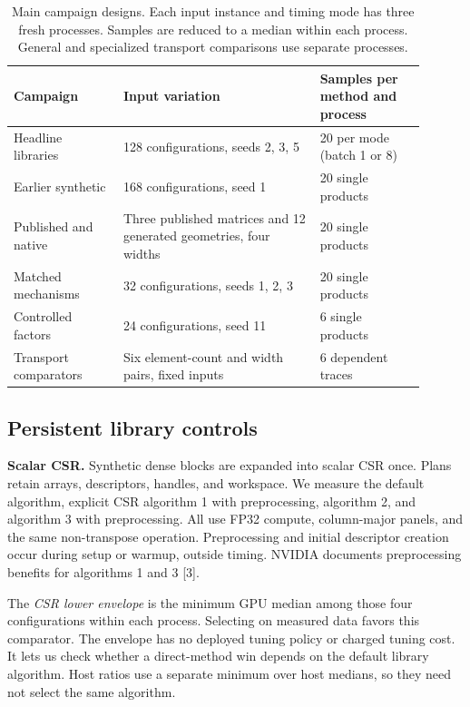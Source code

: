 \documentclass[10pt]{article}
\begin{document}
\begin{table}[!htbp]
\centering\small
\caption{Main campaign designs. Each input instance and timing mode has
three fresh processes. Samples are reduced to a median within each process.
General and specialized transport comparisons use separate processes.}\label{tab:campaigns}
\begin{tabular}{p{0.24\linewidth}p{0.43\linewidth}p{0.23\linewidth}}
\toprule
Campaign & Input variation & Samples per method and process\\
\midrule
Headline libraries & 128 configurations, seeds 2, 3, 5 & 20 per mode (batch 1 or 8)\\
Earlier synthetic & 168 configurations, seed 1 & 20 single products\\
Published and native & Three published matrices and 12 generated geometries, four widths & 20 single products\\
Matched mechanisms & 32 configurations, seeds 1, 2, 3 & 20 single products\\
Controlled factors & 24 configurations, seed 11 & 6 single products\\
Transport comparators & Six element-count and width pairs, fixed inputs & 6 dependent traces\\
\bottomrule
\end{tabular}
\end{table}

\subsection{Persistent library controls}
\textbf{Scalar CSR.} Synthetic dense blocks are expanded into scalar CSR
once. Plans retain arrays, descriptors, handles, and workspace. We measure
the default algorithm, explicit CSR algorithm 1 with preprocessing,
algorithm 2, and algorithm 3 with preprocessing. All use FP32 compute,
column-major panels, and the same non-transpose operation. Preprocessing and
initial descriptor creation occur during setup or warmup, outside timing.
NVIDIA documents preprocessing benefits for algorithms 1 and 3 [3].

The \emph{CSR lower envelope} is the minimum GPU median among those four
configurations within each process. Selecting on measured data favors this comparator. The envelope has no
deployed tuning policy or charged tuning cost. It lets us check whether
a direct-method win depends on the default library algorithm. Host ratios use a separate
minimum over host medians, so they need not select the same algorithm.
\end{document}
